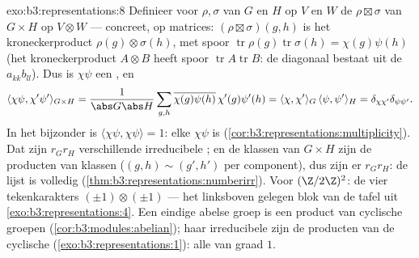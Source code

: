 \begin{solution}{exo:b3:representations:8}
Definieer voor  $\rho, \sigma$ van $G$ en $H$ op $V$
en $W$ de  $\rho \boxtimes \sigma$ van $G \times H$
op $V \otimes W$ --- concreet, op matrices: $(\rho\boxtimes
\sigma)(g,h)$ is het kroneckerproduct $\rho(g)\otimes \sigma(h)$,
met spoor $\operatorname{tr}\rho(g)\operatorname{tr}\sigma(h) =
\chi(g)\psi(h)$ (het kroneckerproduct $A \otimes B$ heeft spoor
$\operatorname{tr}A\operatorname{tr}B$: de diagonaal bestaat uit
de $a_{kk}b_{ll}$). Dus is $\chi\psi$ een , en
\[
\langle\chi\psi, \chi'\psi'\rangle_{G\times H}
= \frac{1}{\abs G\abs H}\sum_{g,h}
\overline{\chi(g)\psi(h)}\,\chi'(g)\psi'(h)
= \langle\chi,\chi'\rangle_G\,\langle\psi,\psi'\rangle_H
= \delta_{\chi\chi'}\delta_{\psi\psi'}.
\]
In het bijzonder is $\langle\chi\psi,\chi\psi\rangle = 1$: elke
$\chi\psi$ is 
(\cref{cor:b3:representations:multiplicity}). Dat zijn $r_Gr_H$
verschillende irreducibele ; en de klassen van $G\times
H$ zijn de producten van klassen ($(g,h) \sim (g',h')$ per
component), dus zijn er $r_Gr_H$: de lijst is volledig
(\cref{thm:b3:representations:numberirr}). Voor $(\Z/2\Z)^2$: de
vier tekenkarakters $(\pm1)\otimes(\pm1)$ --- het linksboven
gelegen blok van de tafel uit \cref{exo:b3:representations:4}. Een
eindige abelse groep is een product van cyclische groepen
(\cref{cor:b3:modules:abelian}); haar irreducibele  zijn
de producten van de cyclische 
(\cref{exo:b3:representations:1}): alle van graad $1$.
\end{solution}


